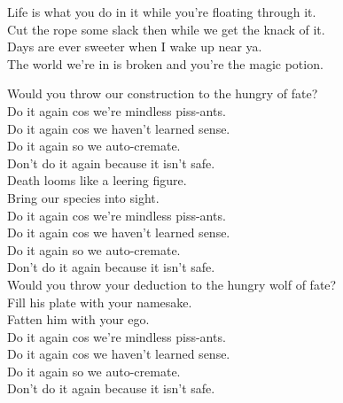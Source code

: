 Life is what you do in it while you're floating through it. \\
Cut the rope some slack then while we get the knack of it. \\
Days are ever sweeter when I wake up near ya. \\
The world we're in is broken and you're the magic potion. \\




Would you throw our construction to the hungry  of fate? \\

Do it again cos we're mindless piss-ants. \\
Do it again cos we haven't learned sense. \\
Do it again so we auto-cremate. \\
Don't do it again because it isn't safe. \\

Death looms like a leering figure. \\
Bring our species into sight. \\

Do it again cos we're mindless piss-ants. \\
Do it again cos we haven't learned sense. \\
Do it again so we auto-cremate. \\
Don't do it again because it isn't safe. \\

Would you throw your deduction to the hungry wolf of fate? \\
Fill his plate with your namesake. \\
Fatten him with your ego. \\

Do it again cos we're mindless piss-ants. \\
Do it again cos we haven't learned sense. \\
Do it again so we auto-cremate. \\
Don't do it again because it isn't safe. \\
